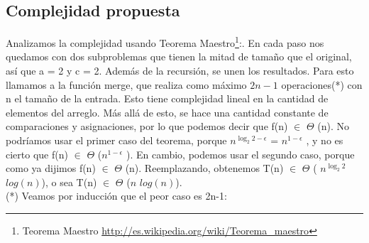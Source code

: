     




\subsection{Complejidad propuesta}

Analizamos la complejidad usando Teorema Maestro\footnote{Teorema Maestro \url{http://es.wikipedia.org/wiki/Teorema_maestro}}:. En cada paso nos quedamos con dos subproblemas que tienen la mitad de tamaño que el original, así que a = 2 y c = 2. Además de la recursión, se unen los resultados. Para esto llamamos a la función merge, que realiza como máximo $2n-1$ operaciones(*) con n el tamaño de la entrada. Esto tiene complejidad lineal en la cantidad de elementos del arreglo. Más allá de esto, se hace una cantidad constante de comparaciones y asignaciones, por lo que podemos decir que f(n)  $\in$  $\Theta$ 
(n). No podríamos usar el primer caso del teorema, porque $n^{\log_2 2-\epsilon}$ = $n^{1 - \epsilon}$ , y no es cierto que f(n) $\in$  $\Theta$ ($n^{1 - \epsilon}$ ). En cambio, podemos usar el segundo caso, porque como ya dijimos f(n) $\in$ $\Theta$ (n). Reemplazando, obtenemos T(n) $\in$
 $\Theta$ ( $n^{\log_2 2}$  $log (n)$), o sea T(n) $\in$  $\Theta$ ($n$  $log (n)$).
 \\
 
 (*)
 Veamos por inducción que el peor caso es 2n-1:
 \\
 

